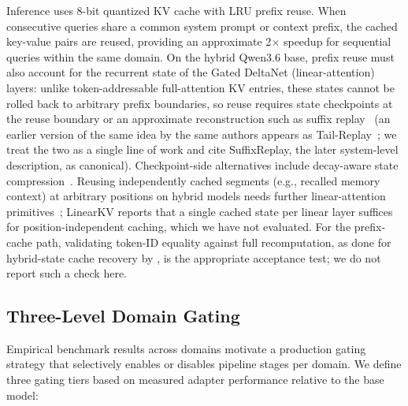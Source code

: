 \documentclass[11pt,a4paper]{article}
\begin{document}
Inference uses 8-bit quantized KV cache with LRU prefix reuse. When consecutive queries share a common system prompt or context prefix, the cached key-value pairs are reused, providing an approximate 2$\times$ speedup for sequential queries within the same domain. On the hybrid Qwen3.6 base, prefix reuse must also account for the recurrent state of the Gated DeltaNet (linear-attention) layers: unlike token-addressable full-attention KV entries, these states cannot be rolled back to arbitrary prefix boundaries, so reuse requires state checkpoints at the reuse boundary or an approximate reconstruction such as suffix replay~\citep{liu2026suffixreplay} (an earlier version of the same idea by the same authors appears as Tail-Replay~\citep{liu2026tailreplay}; we treat the two as a single line of work and cite SuffixReplay, the later system-level description, as canonical). Checkpoint-side alternatives include decay-aware state compression~\citep{yu2026dasc}. Reusing independently cached segments (e.g., recalled memory context) at arbitrary positions on hybrid models needs further linear-attention primitives~\citep{liu2026hypic,liu2026linearkv}; LinearKV reports that a single cached state per linear layer suffices for position-independent caching, which we have not evaluated. For the prefix-cache path, validating token-ID equality against full recomputation, as done for hybrid-state cache recovery by \citet{li2026hybridstate}, is the appropriate acceptance test; we do not report such a check here.

\subsection{Three-Level Domain Gating}
\label{sec:domain-gating}

Empirical benchmark results across domains motivate a production gating strategy that selectively enables or disables pipeline stages per domain. We define three gating tiers based on measured adapter performance relative to the base model:
\end{document}
